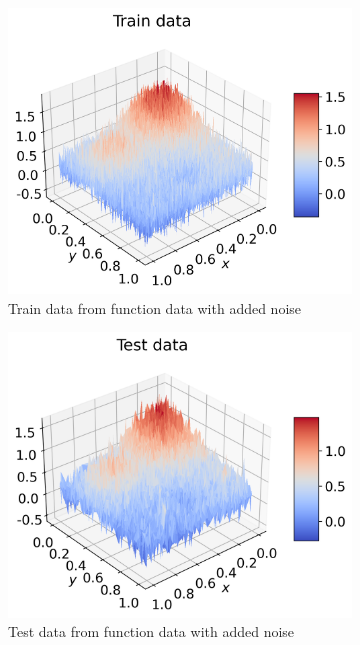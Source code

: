 \documentclass[12pt]{article}
\begin{document}
\begin{figure}[H]
\begin{subfigure}{.5\textwidth}
    \includegraphics[width=\textwidth]{../figures/train_data_franke_extra.png}
    \caption{Train data from function data with added noise}
    \label{fig:extra_pred_train}
  \end{subfigure}
  \begin{subfigure}{.5\textwidth}
    \centering
    \includegraphics[width=\textwidth]{../figures/test_data_franke_extra.png}
    \caption{Test data from function data with added noise}
    \label{fig:extra_pred_test}
  \end{subfigure}
  \begin{subfigure}{.5\textwidth}

\end{subfigure}
\end{figure}
\end{document}
